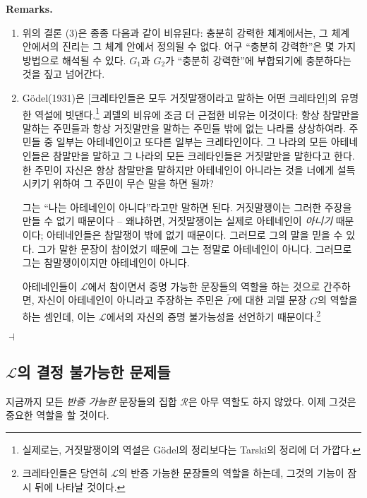 \documentclass[12pt]{paper}
\newenvironment{context}[1][]
{ \noindent \textbf{{#1}.}
}
{ \hfill $ \dashv $
}
\begin{document}
  \begin{context}[Remarks]
    \begin{enumerate}
      \item 위의 결론 (3)은 종종 다음과 같이 비유된다:
      충분히 강력한 체계에서는, 그 체계 안에서의 진리는 그 체계 안에서 정의될 수 없다.
      어구 ``충분히 강력한''은 몇 가지 방법으로 해석될 수 있다.
      $G_1$과 $G_2$가 ``충분히 강력한''에 부합되기에 충분하다는 것을 짚고 넘어간다.

      \item G\"odel(1931)은 [크레타인들은 모두 거짓말쟁이라고 말하는 어떤 크레타인]의 유명한 역설에 빗댄다.\footnote
      {
        실제로는, 거짓말쟁이의 역설은 G\"odel의 정리보다는 Tarski의 정리에 더 가깝다.
      }
      괴델의 비유에 조금 더 근접한 비유는 이것이다:
      항상 참말만을 말하는 주민들과 항상 거짓말만을 말하는 주민들 밖에 없는 나라를 상상하여라.
      주민들 중 일부는 아테네인이고 또다른 일부는 크레타인이다.
      그 나라의 모든 아테네인들은 참말만을 말하고 그 나라의 모든 크레타인들은 거짓말만을 말한다고 한다.
      한 주민이 자신은 항상 참말만을 말하지만 아테네인이 아니라는 것을 너에게 설득시키기 위하여 그 주민이 무슨 말을 하면 될까?

      그는 ``나는 아테네인이 아니다''라고만 말하면 된다.
      거짓말쟁이는 그러한 주장을 만들 수 없기 때문이다 --
      왜냐하면, 거짓말쟁이는 실제로 아테네인이 \textit{아니기} 때문이다;
      아테네인들은 참말쟁이 밖에 없기 때문이다.
      그러므로 그의 말을 믿을 수 있다.
      그가 말한 문장이 참이었기 때문에 그는 정말로 아테네인이 아니다.
      그러므로 그는 참말쟁이이지만 아테네인이 아니다.

      아테네인들이 $\mathcal{L}$에서 참이면서 증명 가능한 문장들의 역할을 하는 것으로 간주하면,
      자신이 아테네인이 아니라고 주장하는 주민은 $\tilde{P}$에 대한 괴델 문장 $G$의 역할을 하는 셈인데,
      이는 $\mathcal{L}$에서의 자신의 증명 불가능성을 선언하기 때문이다.\footnote
      {
        크레타인들은 당연히 $\mathcal{L}$의 반증 가능한 문장들의 역할을 하는데,
        그것의 기능이 잠시 뒤에 나타날 것이다.
      }
    \end{enumerate}
  \end{context}

  \subsection{$\mathcal{L}$의 결정 불가능한 문제들}
  \hspace{12pt}

  지금까지 모든 \textit{반증 가능한} 문장들의 집합 $\mathcal{R}$은 아무 역할도 하지 않았다.
  이제 그것은 중요한 역할을 할 것이다.
\end{document}
